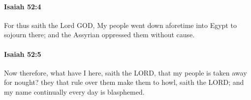		\paragraph{Isaiah 52:4} %
			\label{ISAIAH-52-4}

			For thus saith the Lord GOD, My people went down aforetime into Egypt to sojourn there; and the Assyrian oppressed them without cause.


		\paragraph{Isaiah 52:5} %
			\label{ISAIAH-52-5}

			Now therefore, what have I here, saith the LORD, that my people is taken away for nought? they that rule over them make them to howl, saith the LORD; and my name continually every day is blasphemed.


